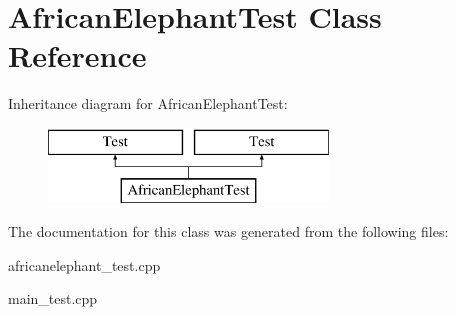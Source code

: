\hypertarget{class_african_elephant_test}{}\section{African\+Elephant\+Test Class Reference}
\label{class_african_elephant_test}
Inheritance diagram for African\+Elephant\+Test\+:\begin{figure}[H]
\begin{center}
\leavevmode
\includegraphics[height=2.000000cm]{class_african_elephant_test}
\end{center}
\end{figure}


The documentation for this class was generated from the following files\+:\begin{DoxyCompactItemize}
\item 
africanelephant\+\_\+test.\+cpp\item 
main\+\_\+test.\+cpp\end{DoxyCompactItemize}
